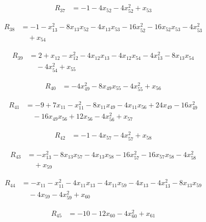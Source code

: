 \documentclass[11pt,letterpaper]{article}
\theoremstyle{definition}
\theoremstyle{remark}
\begin{document}
\begin{align*}
R_{37} &= -1 -4 x_{52} -4 x_{52}^{2} +x_{53}
\end{align*}

\begin{align*}
R_{38} &= -1 -x_{13}^{2} -8 x_{13} x_{52} -4 x_{13} x_{53} -16 x_{52}^{2} -16 x_{52} x_{53} -4 x_{53}^{2} \\
&\quad +x_{54}
\end{align*}

\begin{align*}
R_{39} &= 2 +x_{12} -x_{12}^{2} -4 x_{12} x_{13} -4 x_{12} x_{54} -4 x_{13}^{2} -8 x_{13} x_{54} \\
&\quad -4 x_{54}^{2} +x_{55}
\end{align*}

\begin{align*}
R_{40} &= -4 x_{49}^{2} -8 x_{49} x_{55} -4 x_{55}^{2} +x_{56}
\end{align*}

\begin{align*}
R_{41} &= -9 +7 x_{11} -x_{11}^{2} -8 x_{11} x_{49} -4 x_{11} x_{56} +24 x_{49} -16 x_{49}^{2} \\
&\quad -16 x_{49} x_{56} +12 x_{56} -4 x_{56}^{2} +x_{57}
\end{align*}

\begin{align*}
R_{42} &= -1 -4 x_{57} -4 x_{57}^{2} +x_{58}
\end{align*}

\begin{align*}
R_{43} &= -x_{13}^{2} -8 x_{13} x_{57} -4 x_{13} x_{58} -16 x_{57}^{2} -16 x_{57} x_{58} -4 x_{58}^{2} \\
&\quad +x_{59}
\end{align*}

\begin{align*}
R_{44} &= -x_{11} -x_{11}^{2} -4 x_{11} x_{13} -4 x_{11} x_{59} -4 x_{13} -4 x_{13}^{2} -8 x_{13} x_{59} \\
&\quad -4 x_{59} -4 x_{59}^{2} +x_{60}
\end{align*}

\begin{align*}
R_{45} &= -10 -12 x_{60} -4 x_{60}^{2} +x_{61}
\end{align*}
\end{document}
